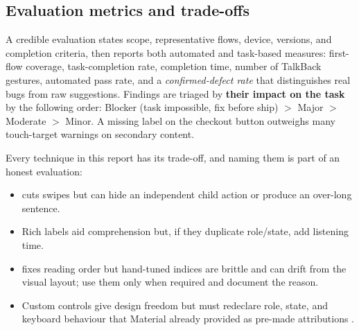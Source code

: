 \subsection{Evaluation metrics and trade-offs}

A credible evaluation states scope, representative flows, device, versions, and completion criteria,
then reports both automated and task-based measures: first-flow coverage, task-completion rate,
completion time, number of TalkBack gestures, automated pass rate, and a \emph{confirmed-defect
	rate} that distinguishes real bugs from raw suggestions. Findings are triaged by \textbf{their impact on
	the task} by the following order: Blocker (task impossible, fix before ship) $>$ Major $>$ Moderate
$>$ Minor. A missing label on the checkout button outweighs many
touch-target warnings on secondary content.

Every technique in this report has its trade-off, and naming them is part of an honest evaluation:

\begin{itemize}[leftmargin=1.4em]
	\item {} cuts swipes but can hide an independent child action or produce an
	      over-long sentence.
	\item Rich labels aid comprehension but, if they duplicate role/state, add listening time.
	\item {} fixes reading order but hand-tuned indices are brittle and can drift
	      from the visual layout; use them only when required and document the reason.
	\item Custom controls give design freedom but must redeclare role, state, and keyboard behaviour
	      that Material already provided as pre-made attributions .
\end{itemize}
